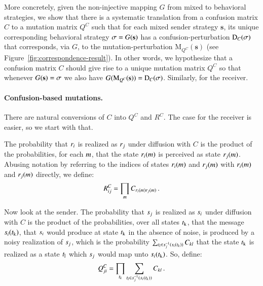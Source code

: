 \documentclass[fleqn,reqno,10pt]{article}
\renewcommand{\Smixed}{\ensuremath{\mathrm{\mathbf{s}}}}
\newcommand{\Diff}{\ensuremath{\mathrm{D}}} %
\newcommand{\Mutate}{\ensuremath{\mathrm{M}}} %
\begin{document}
More concretely, given the non-injective mapping $G$ from mixed to
behavioral strategies, we show that there is a systematic translation
from a confusion matrix $C$ to a mutation matrix $Q^C$ such that for
each mixed sender strategy $\Smixed$, its unique corresponding
behavioral strategy $\Sstrat = G(\Smixed)$ has a
confusion-perturbation $\Diff_C(\Sstrat)$ that corresponds, via $G$,
to the mutation-perturbation $\Mutate_{Q^C}(\Smixed)$ (see
Figure~\ref{fig:correspondence-result}). In other words, we
hypothesize that a confusion matrix $C$ should give rise to a unique
mutation matrix $Q^C$ so that whenever $G(\Smixed) = \Sstrat$ we also
have $G(\Mutate_{Q^C}(\Smixed)) = \Diff_C(\Sstrat)$. Similarly, for
the receiver.

\paragraph{Confusion-based mutations.} There are natural conversions
of $C$ into $Q^C$ and $R^C$. The case for the receiver is easier, so
we start with that.

The probability that $r_i$ is realized as $r_j$ under
diffusion with $C$ is the product of the probabilities, for each
$m$, that the state $r_i(m)$ is perceived as state
$r_j(m)$. Abusing notation by referring to the indices of
states $r_i(m)$ and $r_j(m)$ with
$r_i(m)$ and $r_j(m)$ directly, we define:
\begin{align}
  \label{eq:construction-rec}
  R^C_{ij} = \prod_{m} C_{r_i(m)r_j(m)}\,.
\end{align}

Now look at the sender. The probability that $s_j$ is realized as
$s_i$ under diffusion with $C$ is the product of the
probabilities, over all states $t_{\mathrm{k}}$, that the message
$s_i(t_{\mathrm{k}})$, that $s_i$ would produce at state
$t_{\mathrm{k}}$ in the absence of noise, is produced by a noisy
realization of $s_j$, which is the probability $\sum_{t_l
  \in s_j^{-1}(s_i(t_k))} C_{kl}$ that the state
$t_{\mathrm{k}}$ is realized as a state $t_{\mathrm{l}}$ which $s_j$
would map unto $s_i(t_{\mathrm{k}})$. So, define:
\begin{align}
  \label{eq:construction-sen}
  Q^C_{ji} = \prod_{t_k} \sum_{t_l \in
    s_j^{-1}(s_i(t_k))} C_{kl}\,.
\end{align}
\end{document}
